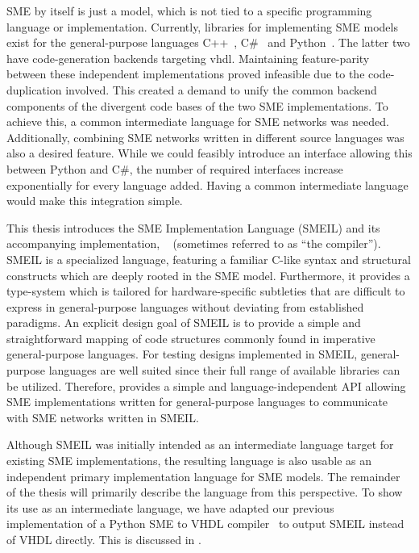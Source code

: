 SME by itself is just a model, which is not tied to a specific programming
language or implementation. Currently, libraries for implementing SME models
exist for the general-purpose languages C++~\cite{asheim2015},
C\#~\cite{skovhede2016building} and Python~\cite{asheim2016vhdl}. The latter two
have code-generation backends targeting \gls{vhdl}. Maintaining feature-parity
between these independent implementations proved infeasible due to the
code-duplication involved. This created a demand to unify the common backend
components of the divergent code bases of the two SME implementations. To
achieve this, a common intermediate language for SME networks was
needed. Additionally, combining SME networks written in different source
languages was also a desired feature. While we could feasibly introduce an
interface allowing this between Python and C\#, the number of required
interfaces increase exponentially for every language added. Having a common
intermediate language would make this integration simple.

This thesis introduces the SME Implementation Language (SMEIL) and its
accompanying implementation, \libsme{}~\cite{libsme} (sometimes referred to as
``the compiler'').
SMEIL is a specialized language, featuring a familiar C-like syntax and
structural constructs which are deeply rooted in the SME model. Furthermore, it
provides a type-system which is tailored for hardware-specific subtleties that
are difficult to express in general-purpose languages without deviating from
established paradigms. An explicit design goal of SMEIL is to provide a simple
and straightforward mapping of code structures commonly found in imperative
general-purpose languages. For testing designs implemented in SMEIL,
general-purpose languages are well suited since their full range of available
libraries can be utilized. Therefore, \libsme{} provides a simple and
language-independent API allowing SME implementations written for
general-purpose languages to communicate with SME networks written in SMEIL.

Although SMEIL was initially intended as an intermediate language target for
existing SME implementations, the resulting language
is also usable as an independent primary implementation language for SME
models. The remainder of the thesis will primarily describe the language from
this perspective. To show its use as an intermediate language, we have adapted
our previous implementation of a Python SME to VHDL compiler~\cite{almique} to
output SMEIL instead of VHDL directly. This is discussed in .


